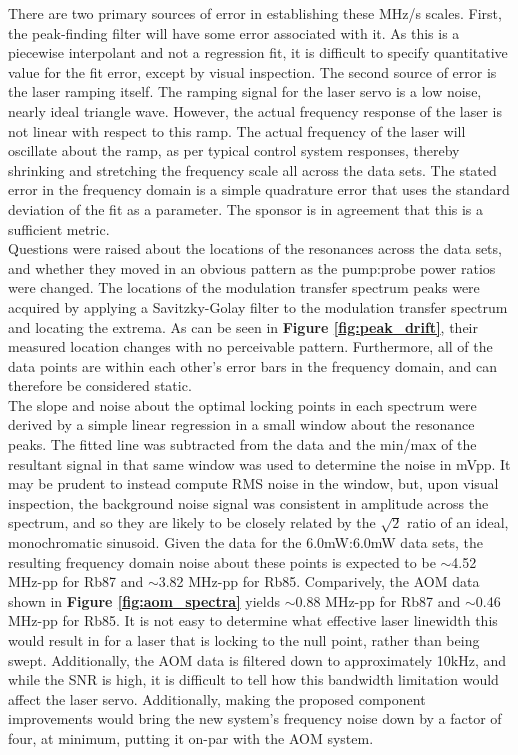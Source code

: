 There are two primary sources of error in establishing these MHz/s scales. First, the peak-finding filter will have some error associated with it. As this is a piecewise interpolant and not a regression fit, it is difficult to specify quantitative value for the fit error, except by visual inspection. The second source of error is the laser ramping itself. The ramping signal for the laser servo is a low noise, nearly ideal triangle wave. However, the actual frequency response of the laser is not linear with respect to this ramp. The actual frequency of the laser will oscillate about the ramp, as per typical control system responses, thereby shrinking and stretching the frequency scale all across the data sets. The stated error in the frequency domain is a simple quadrature error that uses the standard deviation of the fit as a parameter. The sponsor is in agreement that this is a sufficient metric. \\

Questions were raised about the locations of the resonances across the data sets, and whether they moved in an obvious pattern as the pump:probe power ratios were changed. The locations of the modulation transfer spectrum peaks were acquired by applying a Savitzky-Golay filter to the modulation transfer spectrum and locating the extrema. As can be seen in \textbf{Figure \ref{fig:peak_drift}}, their measured location changes with no perceivable pattern. Furthermore, all of the data points are within each other's error bars in the frequency domain, and can therefore be considered static. \\

The slope and noise about the optimal locking points in each spectrum were derived by a simple linear regression in a small window about the resonance peaks. The fitted line was subtracted from the data and the min/max of the resultant signal in that same window was used to determine the noise in mVpp. It may be prudent to instead compute RMS noise in the window, but, upon visual inspection, the background noise signal was consistent in amplitude across the spectrum, and so they are likely to be closely related by the $\sqrt{2}$ ratio of an ideal, monochromatic sinusoid. Given the data for the 6.0mW:6.0mW data sets, the resulting frequency domain noise about these points is expected to be $\sim$4.52 MHz-pp for Rb87 and $\sim$3.82 MHz-pp for Rb85. Comparively, the AOM data shown in \textbf{Figure \ref{fig:aom_spectra}} yields $\sim$0.88 MHz-pp for Rb87 and $\sim$0.46 MHz-pp for Rb85. It is not easy to determine what effective laser linewidth this would result in for a laser that is locking to the null point, rather than being swept. Additionally, the AOM data is filtered down to approximately 10kHz, and while the SNR is high, it is difficult to tell how this bandwidth limitation would affect the laser servo. Additionally, making the proposed component improvements would bring the new system's frequency noise down by a factor of four, at minimum, putting it on-par with the AOM system.

